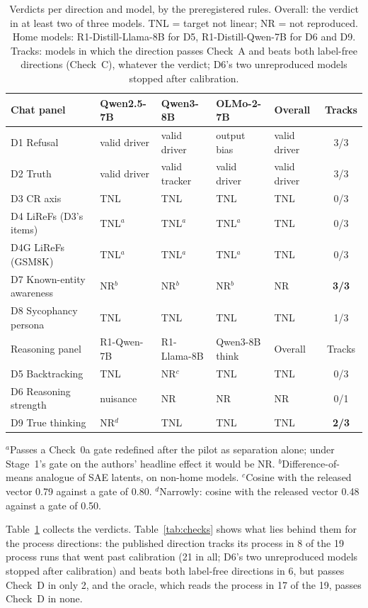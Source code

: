 \documentclass[11pt]{article}
\begin{document}
\begin{table}[t]
\centering\small
\caption{Verdicts per direction and model, by the preregistered rules. Overall: the verdict in at least two of three models. TNL = target not linear; NR = not reproduced. Home models: R1-Distill-Llama-8B for D5, R1-Distill-Qwen-7B for D6 and D9. Tracks: models in which the direction passes Check~A and beats both label-free directions (Check~C), whatever the verdict; D6's two unreproduced models stopped after calibration.}
\label{tab:verdicts}
\begin{tabular}{@{}l l l l l c@{}}
\toprule
Chat panel & Qwen2.5-7B & Qwen3-8B & OLMo-2-7B & Overall & Tracks \\
\midrule
D1 Refusal & valid driver & valid driver & output bias & valid driver & 3/3 \\
D2 Truth & valid driver & valid tracker & valid driver & valid driver & 3/3 \\
D3 CR axis & TNL & TNL & TNL & TNL & 0/3 \\
D4 LiReFs (D3's items) & TNL$^{a}$ & TNL$^{a}$ & TNL$^{a}$ & TNL & 0/3 \\
D4G LiReFs (GSM8K) & TNL$^{a}$ & TNL$^{a}$ & TNL$^{a}$ & TNL & 0/3 \\
D7 Known-entity awareness & NR$^{b}$ & NR$^{b}$ & NR$^{b}$ & NR & \textbf{3/3} \\
D8 Sycophancy persona & TNL & TNL & TNL & TNL & 1/3 \\
\midrule
Reasoning panel & R1-Qwen-7B & R1-Llama-8B & Qwen3-8B think & Overall & Tracks \\
\midrule
D5 Backtracking & TNL & NR$^{c}$ & TNL & TNL & 0/3 \\
D6 Reasoning strength & nuisance & NR & NR & NR & 0/1 \\
D9 True thinking & NR$^{d}$ & TNL & TNL & TNL & \textbf{2/3} \\
\bottomrule
\end{tabular}

\vspace{0.3em}
\parbox{\linewidth}{\footnotesize $^{a}$Passes a Check~0a gate redefined after the pilot as separation alone; under Stage~1's gate on the authors' headline effect it would be NR. $^{b}$Difference-of-means analogue of SAE latents, on non-home models. $^{c}$Cosine with the released vector 0.79 against a gate of 0.80. $^{d}$Narrowly: cosine with the released vector 0.48 against a gate of 0.50.}
\end{table}

Table~\ref{tab:verdicts} collects the verdicts. Table~\ref{tab:checks} shows what lies behind them for the process directions: the published direction tracks its process in 8 of the 19 process runs that went past calibration (21 in all; D6's two unreproduced models stopped after calibration) and beats both label-free directions in 6, but passes Check~D in only 2, and the oracle, which reads the process in 17 of the 19, passes Check~D in none.
\end{document}
